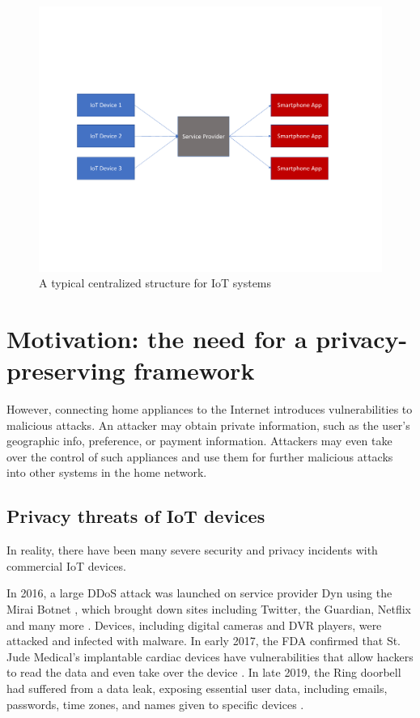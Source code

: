 \begin{figure}
	\centering
	\includegraphics[width=0.9\linewidth]{centralized_structure.pdf}
	\caption{A typical centralized structure for IoT systems}
	\label{fig:centralized}
\end{figure}

\section{Motivation: the need for a privacy-preserving framework}
However, connecting home appliances to the Internet introduces vulnerabilities to malicious attacks. An attacker may obtain private information, such as the user's geographic info, preference, or payment information. Attackers may even take over the control of such appliances and use them for further malicious attacks into other systems in the home network. 

\subsection{Privacy threats of IoT devices}
In reality, there have been many severe security and privacy incidents with commercial IoT devices.

In 2016, a large DDoS attack was launched on service provider Dyn using the Mirai Botnet \cite{antonakakis2017understanding}, which brought down sites including Twitter, the Guardian, Netflix and many more \cite{2006mirai}. Devices, including digital cameras and DVR players, were attacked and infected with malware. In early 2017, the FDA confirmed that St. Jude Medical's implantable cardiac devices have vulnerabilities that allow hackers to read the data and even take over the device \cite{2017fda}. In late 2019, the Ring doorbell had suffered from a data leak, exposing essential user data, including emails, passwords, time zones, and names given to specific devices \cite{2019ring}.

